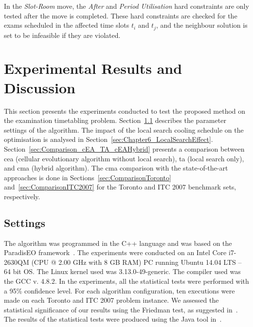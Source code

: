 In the \textit{Slot-Room} move, the \textit{After} and \textit{Period Utilisation} hard constraints are only tested after the move is completed. These hard constraints are checked for the exams scheduled in the affected time slots $t_i$ and $t_j$, and the neighbour solution is set to be infeasible if they are violated. 






%
%
\section{Experimental Results and Discussion}
\label{sec:Chapter6_ExperimentalResults}

This section presents the experiments conducted to test the proposed method on the examination timetabling problem. Section~\ref{sec:Settings} describes the parameter settings of the algorithm. The impact of the local search cooling schedule on the optimisation is analysed in Section~\ref{sec:Chapter6_LocalSearchEffect}. Section~\ref{sec:Comparison_cEA_TA_cEAHybrid} presents a comparison between \gls{cea} (cellular evolutionary algorithm without local search), \gls{ta} (local search only), and \gls{cma} (hybrid algorithm). The \gls{cma} comparison with the state-of-the-art approaches is done in Sections~\ref{sec:ComparisonToronto} and~\ref{sec:ComparisonITC2007} for the Toronto and ITC 2007 benchmark sets, respectively.


\subsection{Settings}
\label{sec:Settings}

The algorithm was programmed in the C++ language and was based on the ParadisEO framework~\cite{ParadisEO-Cahon2004}. The experiments were conducted on an Intel Core i7-2630QM (CPU @ 2.00 GHz with 8 GB RAM) PC running Ubuntu 14.04 LTS -- 64 bit OS. The Linux kernel used was 3.13.0-49-generic. The compiler used was the GCC v. 4.8.2. In the experiments, all the statistical tests were performed with a 95\% confidence level. For each algorithm configuration, ten executions were made on each Toronto and ITC 2007 problem instance. We assessed the statistical significance of our results using the Friedman test, as suggested in~\cite{Garcia2008}. The results of the statistical tests were produced using the Java tool in~\cite{Garcia2008}. 



